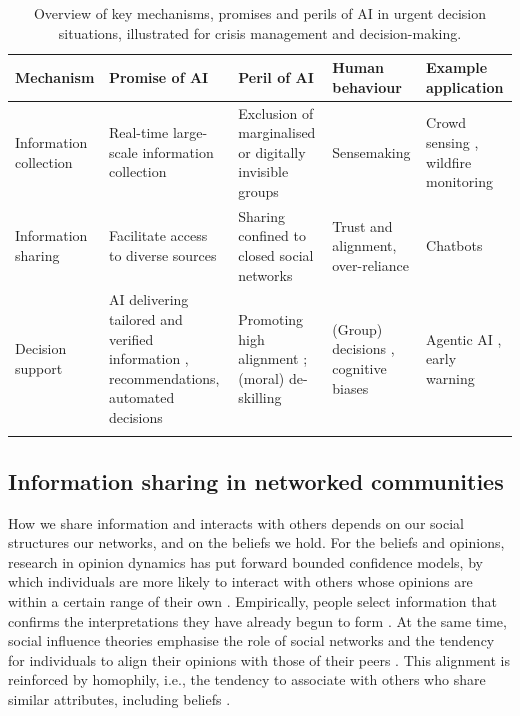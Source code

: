 \documentclass[pdflatex,sn-basic]{sn-jnl}
\begin{document}
\begin{table}[h]
\caption{Overview of key mechanisms, promises and perils of AI in urgent decision situations, illustrated for crisis management and decision-making.}\label{tab:mechanisms}
\begin{tabular}{@{}p{2.2cm}p{2.6cm}p{2.6cm}p{2.6cm}p{2.6cm}@{}}
\toprule
Mechanism & Promise of AI & Peril of AI & Human behaviour & Example application \\
\midrule
Information collection & Real-time large-scale information collection \citep{narmatha2025disaster} & Exclusion of marginalised or digitally invisible groups \citep{coleman2024weaving} & Sensemaking \citep{klein2010rapid} & Crowd sensing \citep{mai2025evaluating}, wildfire monitoring \citep{roy2024multi} \\
Information sharing & Facilitate access to diverse sources \citep{jeon2024hearhere} & Sharing confined to closed social networks & Trust and alignment, over-reliance \citep{manzini2024should} & Chatbots \citep{urbanelli2024ermes} \\
Decision support & AI delivering tailored and verified information \citep{zhao2025tailoring}, recommendations, automated decisions & Promoting high alignment \citep{manzini2024should}; (moral) de-skilling \citep{vallor2015moral} & (Group) decisions \citep{comes2024ai}, cognitive biases \citep{paulus2022influence} & Agentic AI \citep{acharya2025agentic}, early warning \citep{reichstein2025early} \\
\botrule
\end{tabular}
\end{table}

\subsection{Information sharing in networked communities}\label{sec:sharing}
 
How we share information and interacts with others depends on our social structures our networks, and on the beliefs we hold. For the beliefs and opinions, research in opinion dynamics has put forward bounded confidence models, by which individuals are more likely to interact with others whose opinions are within a certain range of their own \citep{hegselmann2002opinion}. Empirically, people select information that confirms the interpretations they have already begun to form \citep{paulus2022influence}. At the same time, social influence theories emphasise the role of social networks and the tendency for individuals to align their opinions with those of their peers \citep{friedkin1999social}. This alignment is reinforced by homophily, i.e., the tendency to associate with others who share similar attributes, including beliefs
\citep{mcpherson2001birds}. 
\end{document}
